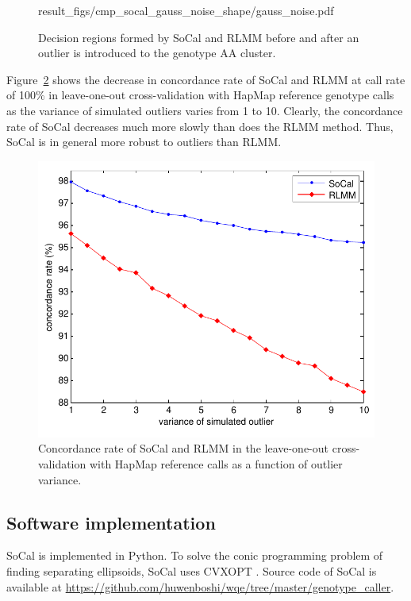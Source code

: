 \documentclass{scrartcl}
\begin{document}
\begin{figure}[H]
{            {result_figs/cmp_socal_gauss_noise_shape/gauss_noise.pdf}
        \label{fig:gauss_region_no_noise}
    }
    \caption{Decision regions formed by SoCal and RLMM before and after an
             outlier is introduced to the genotype AA cluster.}
    \label{fig:cmp_shape_noise}
\end{figure}

\par
Figure~\ref{fig:result_cmp_noise} shows the decrease in concordance rate of
SoCal and RLMM at call rate of 100\% in leave-one-out cross-validation with
HapMap reference genotype calls as the variance of simulated outliers varies
from 1 to 10.
Clearly, the concordance rate of SoCal decreases much more slowly than does
the RLMM method.
Thus, SoCal is in general more robust to outliers than RLMM.

\begin{figure}[H]
\centering
\includegraphics[scale=0.75]
{result_figs/cmp_socal_gauss_noise/socal_gauss_cmp_noise.pdf}
\caption{Concordance rate of SoCal and RLMM in the leave-one-out
cross-validation with HapMap reference calls as a function of outlier
variance.}
\label{fig:result_cmp_noise}
\end{figure}

\subsection{Software implementation}
SoCal is implemented in Python.
To solve the conic programming problem of finding separating ellipsoids,
SoCal uses CVXOPT \cite{andersen2014}.
Source code of SoCal is available at
\url{https://github.com/huwenboshi/wqe/tree/master/genotype_caller}.
\end{document}
